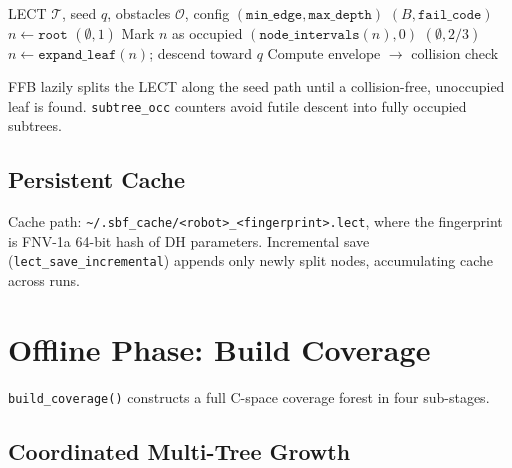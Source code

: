 \documentclass[journal]{IEEEtran}
\newcommand{\calO}{\mathcal{O}}
\begin{document}
\begin{algorithm}[t]
\caption{\texttt{find\_free\_box} --- Search for a safe box in the LECT}
\label{alg:ffb}
\begin{algorithmic}[1]
\Require LECT $\mathcal{T}$, seed $q$, obstacles $\calO$,
  config $(\texttt{min\_edge}, \texttt{max\_depth})$
\Ensure $(B, \texttt{fail\_code})$
\State $n \leftarrow \texttt{root}$
   \Return $(\emptyset, 1)$ \EndIf
    \State Mark $n$ as occupied
    \State \Return $(\texttt{node\_intervals}(n), 0)$
  \EndIf
    \State \Return $(\emptyset, 2/3)$
  \EndIf
  \State $n \leftarrow \texttt{expand\_leaf}(n)$; descend toward $q$
  \State Compute envelope $\rightarrow$ collision check
\EndWhile
\end{algorithmic}
\end{algorithm}

FFB lazily splits the LECT along the seed path until a collision-free,
unoccupied leaf is found.
\texttt{subtree\_occ} counters avoid futile descent into fully occupied
subtrees.

\subsection{Persistent Cache}

Cache path:
\texttt{\textasciitilde/.sbf\_cache/<robot>\_<fingerprint>.lect},
where the fingerprint is FNV-1a 64-bit hash of DH parameters.
Incremental save (\texttt{lect\_save\_incremental}) appends only newly
split nodes, accumulating cache across runs.

\section{Offline Phase: Build Coverage}\label{sec:build}

\texttt{build\_coverage()} constructs a full C-space coverage forest
in four sub-stages.

\subsection{Coordinated Multi-Tree Growth}\label{sec:coordinated}
\end{document}
